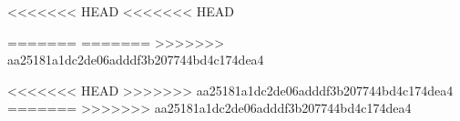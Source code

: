 <<<<<<< HEAD
<<<<<<< HEAD



\usepackage{hyperref}
\hypersetup{
	colorlinks=true,       %
    linkcolor=green,          %
    citecolor=magenta,        %
    filecolor=red,      %
    urlcolor=blue
}
\usepackage[stable]{footmisc}

\newcommand\incite[1]{\english{\citetitle{#1} \cite{#1}}} %
=======
=======
>>>>>>> aa25181a1dc2de06adddf3b207744bd4c174dea4
\usepackage[english,francais]{babel} %
\usepackage{hyperref,fontspec}
\setmainfont[
Ligatures={Common, Rare, TeX},
Numbers=OldStyle,
]
{Junicode}
\usepackage{xeCJK}
\usepackage[stable]{footmisc}
\hypersetup{
	colorlinks=true,       %
    linkcolor=black,          %
    citecolor=black,        %
    filecolor=black,      %
    urlcolor=black
}
<<<<<<< HEAD
>>>>>>> aa25181a1dc2de06adddf3b207744bd4c174dea4
=======
>>>>>>> aa25181a1dc2de06adddf3b207744bd4c174dea4
